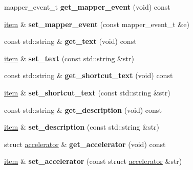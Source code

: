 \begin{DoxyCompactItemize}
\item 
\hypertarget{classDOSBoxMenu_1_1item_ab5ef30cda33f909b453af3504bb11626}{mapper\-\_\-event\-\_\-t {\bfseries get\-\_\-mapper\-\_\-event} (void) const }\label{classDOSBoxMenu_1_1item_ab5ef30cda33f909b453af3504bb11626}

\item 
\hypertarget{classDOSBoxMenu_1_1item_aaae2639d3390fddfa6bb5240648fb196}{\hyperlink{classDOSBoxMenu_1_1item}{item} \& {\bfseries set\-\_\-mapper\-\_\-event} (const mapper\-\_\-event\-\_\-t \&e)}\label{classDOSBoxMenu_1_1item_aaae2639d3390fddfa6bb5240648fb196}

\item 
\hypertarget{classDOSBoxMenu_1_1item_a62a2a5320dbc27ecf25f6c312c94b126}{const std\-::string \& {\bfseries get\-\_\-text} (void) const }\label{classDOSBoxMenu_1_1item_a62a2a5320dbc27ecf25f6c312c94b126}

\item 
\hypertarget{classDOSBoxMenu_1_1item_a4870fb50faa8813a904047e662342648}{\hyperlink{classDOSBoxMenu_1_1item}{item} \& {\bfseries set\-\_\-text} (const std\-::string \&str)}\label{classDOSBoxMenu_1_1item_a4870fb50faa8813a904047e662342648}

\item 
\hypertarget{classDOSBoxMenu_1_1item_a14793d145351e0276b9f8c5f658b3fa1}{const std\-::string \& {\bfseries get\-\_\-shortcut\-\_\-text} (void) const }\label{classDOSBoxMenu_1_1item_a14793d145351e0276b9f8c5f658b3fa1}

\item 
\hypertarget{classDOSBoxMenu_1_1item_ac09a31f5ff1dda13461ec33659a99ae2}{\hyperlink{classDOSBoxMenu_1_1item}{item} \& {\bfseries set\-\_\-shortcut\-\_\-text} (const std\-::string \&str)}\label{classDOSBoxMenu_1_1item_ac09a31f5ff1dda13461ec33659a99ae2}

\item 
\hypertarget{classDOSBoxMenu_1_1item_ad60d14014f01e368e725b50a0d84111a}{const std\-::string \& {\bfseries get\-\_\-description} (void) const }\label{classDOSBoxMenu_1_1item_ad60d14014f01e368e725b50a0d84111a}

\item 
\hypertarget{classDOSBoxMenu_1_1item_a242b22d322474d1cc3b072d6e792567b}{\hyperlink{classDOSBoxMenu_1_1item}{item} \& {\bfseries set\-\_\-description} (const std\-::string \&str)}\label{classDOSBoxMenu_1_1item_a242b22d322474d1cc3b072d6e792567b}

\item 
\hypertarget{classDOSBoxMenu_1_1item_a4b5a7a26cace108685ec5a6f942c4a95}{struct \hyperlink{structDOSBoxMenu_1_1accelerator}{accelerator} \& {\bfseries get\-\_\-accelerator} (void) const }\label{classDOSBoxMenu_1_1item_a4b5a7a26cace108685ec5a6f942c4a95}

\item 
\hypertarget{classDOSBoxMenu_1_1item_a7ddab92764d6691e549dd0dd0dcdac9f}{\hyperlink{classDOSBoxMenu_1_1item}{item} \& {\bfseries set\-\_\-accelerator} (const struct \hyperlink{structDOSBoxMenu_1_1accelerator}{accelerator} \&str)}\label{classDOSBoxMenu_1_1item_a7ddab92764d6691e549dd0dd0dcdac9f}

\end{DoxyCompactItemize}
